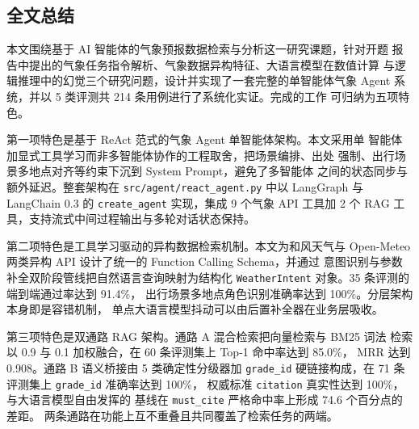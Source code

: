 
\subsection{全文总结}
\label{sec:summary}

本文围绕基于 AI 智能体的气象预报数据检索与分析这一研究课题，针对开题
报告中提出的气象任务指令解析、气象数据异构特征、大语言模型在数值计算
与逻辑推理中的幻觉三个研究问题，设计并实现了一套完整的单智能体气象
Agent 系统，并以 5 类评测共 214 条用例进行了系统化实证。完成的工作
可归纳为五项特色。

第一项特色是基于 ReAct 范式的气象 Agent 单智能体架构。本文采用单
智能体加显式工具学习而非多智能体协作的工程取舍，把场景编排、出处
强制、出行场景多地点对齐等约束下沉到 System Prompt，避免了多智能体
之间的状态同步与额外延迟。整套架构在
\texttt{src/\bk{}agent/\bk{}react\_\bk{}agent.\bk{}py} 中以 LangGraph 与 LangChain 0.3
的 \texttt{create\_\bk{}agent} 实现，集成 9 个气象 API 工具加 2 个 RAG
工具，支持流式中间过程输出与多轮对话状态保持。

第二项特色是工具学习驱动的异构数据检索机制。本文为和风天气与
Open-Meteo 两类异构 API 设计了统一的 Function Calling Schema，并通过
意图识别与参数补全双阶段管线把自然语言查询映射为结构化
\texttt{WeatherIntent} 对象。35 条评测的端到端通过率达到 91.4\%，
出行场景多地点角色识别准确率达到 100\%。分层架构本身即是容错机制，
单点大语言模型抖动可以由后置补全器在业务层吸收。

第三项特色是双通路 RAG 架构。通路 A 混合检索把向量检索与 BM25 词法
检索以 0.9 与 0.1 加权融合，在 60 条评测集上 Top-1 命中率达到 85.0\%，
MRR 达到 0.908。通路 B 语义桥接由 5 类确定性分级器加 \texttt{grade\_\bk{}id}
硬链接构成，在 71 条评测集上 \texttt{grade\_\bk{}id} 准确率达到 100\%，
权威标准 \texttt{citation} 真实性达到 100\%，与大语言模型自由发挥的
基线在 \texttt{must\_\bk{}cite} 严格命中率上形成 74.6 个百分点的差距。
两条通路在功能上互不重叠且共同覆盖了检索任务的两端。

